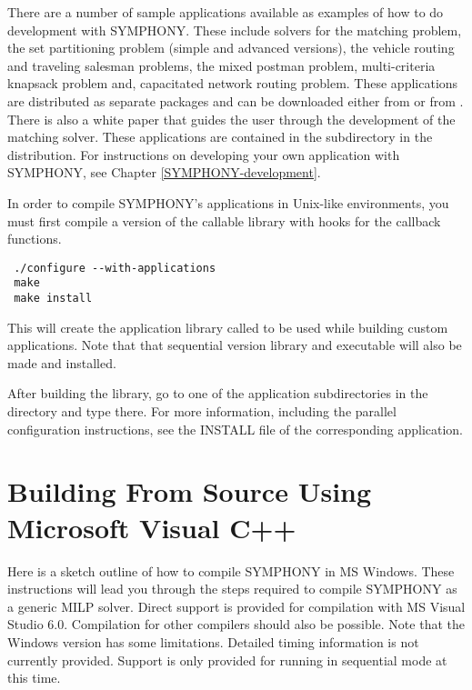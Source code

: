 There are a number of sample applications available as examples of how to do
development with SYMPHONY. These include solvers for the matching problem, the
set partitioning problem (simple and advanced versions), the vehicle routing
and traveling salesman problems, the mixed postman problem, multi-criteria
knapsack problem and, capacitated network routing problem. These applications
are distributed as separate packages and can be downloaded either from
\texttt{} or from 
\texttt{}. There is also a white paper that guides the
user through the development of the matching solver. These applications are
contained in the  subdirectory in the
distribution. For instructions on developing your own application with
SYMPHONY, see Chapter \ref{SYMPHONY-development}.

In order to compile SYMPHONY's applications in Unix-like environments, you
must first compile a version of the callable library with hooks for the
callback functions. {\color{Brown}
\begin{verbatim}
 ./configure --with-applications 
 make 
 make install
\end{verbatim}
}
This will create the application library called  to be used while
building custom applications. Note that that sequential version library and
executable will also be made and installed.

After building the library, go to one of the application subdirectories in the
 directory and type  there. For
more information, including the parallel configuration instructions, see the
INSTALL file of the corresponding application.

\section{Building From Source Using Microsoft Visual C++}
\label{getting_started_windows}

Here is a sketch outline of how to compile SYMPHONY in MS Windows.
These instructions will lead you through the steps required to compile
SYMPHONY as a generic MILP solver. Direct support
is provided for compilation with MS Visual Studio 6.0. Compilation for other
compilers should also be possible. Note that the Windows version has some
limitations. Detailed timing information is not currently provided. Support is
only provided for running in sequential mode at this time.

